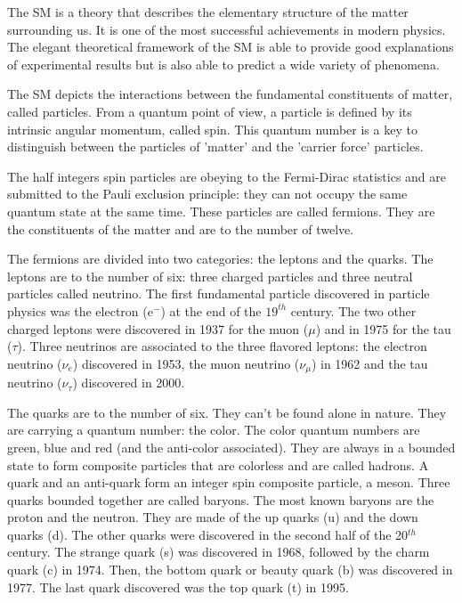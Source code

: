     The \acrfull{SM} is a theory that describes the elementary structure of the matter surrounding us. 
    It is one of the most successful achievements in modern physics.
    The elegant theoretical framework of the \gls{SM} is able to provide good explanations of experimental results but is also able to predict a wide variety of phenomena.

    The \gls{SM} depicts the interactions between the fundamental constituents of matter, called particles.
    From a quantum point of view, a particle is defined by its intrinsic angular momentum, called spin. 
    This quantum number is a key to distinguish between the particles of 'matter' and the 'carrier force' particles.
    
    The half integers spin particles are obeying to the Fermi-Dirac statistics and are submitted to the Pauli exclusion principle:
    they can not occupy the same quantum state at the same time.
    These particles are called fermions.
    They are the constituents of the matter and are to the number of twelve.

    The fermions are divided into two categories: the leptons and the quarks. 
    The leptons are to the number of six: three charged particles and three neutral particles called neutrino.
    The first fundamental particle discovered in particle physics was the electron (e$^-$) at the end of the $19^{th}$ century.
    The two other charged leptons were discovered in 1937 for the muon ($\mu$) and in 1975 for the tau ($\tau$).
    Three neutrinos are associated to the three flavored leptons: the electron neutrino ($\nu_e$) discovered in 1953, the muon neutrino ($\nu_{\mu}$) in 1962 and the tau neutrino ($\nu_{\tau}$) discovered in 2000.

    The quarks are to the number of six.
    They can't be found alone in nature.
    They are carrying a quantum number: the color.
    The color quantum numbers are green, blue and red (and the anti-color associated).
    They are always in a bounded state to form composite particles that are colorless and are called hadrons.
    A quark and an anti-quark form an integer spin composite particle, a meson.
    Three quarks bounded together are called baryons. The most known baryons are the proton and the neutron.
    They are made of the up quarks (u) and the down quarks (d).
    The other quarks were discovered in the second half of the 20$^{th}$ century.
    The strange quark (s) was discovered in 1968, followed by the charm quark (c) in 1974.
    Then, the bottom quark or beauty quark (b) was discovered in 1977.
    The last quark discovered was the top quark (t) in 1995.  

